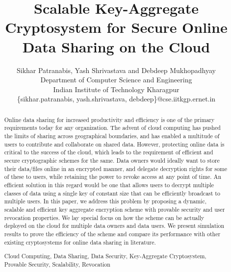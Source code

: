 \documentclass[10pt,journal,compsoc]{IEEEtran}
\title{Scalable Key-Aggregate Cryptosystem for Secure Online Data Sharing on the Cloud}
\begin{document}
% 

\author{Sikhar Patranabis, Yash Shrivastava and Debdeep Mukhopadhyay
\\Department of Computer Science and Engineering\\ Indian Institute of Technology Kharagpur
\\\{sikhar.patranabis, yash.shrivastava, debdeep\}@cse.iitkgp.ernet.in}
\maketitle


\begin{abstract}

Online data sharing for increased productivity and efficiency is one of the primary requirements today for any organization. The advent of cloud computing has pushed the limits of sharing across geographical boundaries, and has enabled a multitude of users to contribute and collaborate on shared data. However, protecting online data is critical to the success of the cloud, which leads to the requirement of efficient and secure cryptographic schemes for the same. Data owners would ideally want to store their data/files online in an encrypted manner, and delegate decryption rights for some of these to users, while retaining the power to revoke access at any point of time. An efficient solution in this regard would be one that allows users to decrypt multiple classes of data using a single key of constant size that can be efficiently broadcast to multiple users. In this paper, we address this problem by proposing  a dynamic, scalable and efficient key aggregate encryption scheme with provable security and user revocation properties. We lay special focus on how the scheme can be actually deployed on the cloud for multiple data owners and data users. We present simulation results to prove the efficiency of the scheme and compare its performance with other existing cryptosystems for online data sharing in literature.

\begin{IEEEkeywords}
 Cloud Computing, Data Sharing, Data Security, Key-Aggregate Cryptosystem, Provable Security, Scalability, Revocation
\end{IEEEkeywords}

\end{abstract}








% 




\begin{scriptsize}


\end{scriptsize}

% 
\end{document}
